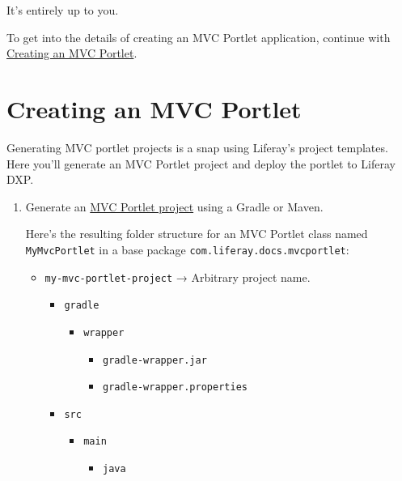 It's entirely up to you.

To get into the details of creating an MVC Portlet application, continue
with
\href{/docs/7-2/appdev/-/knowledge_base/a/creating-an-mvc-portlet}{Creating
an MVC Portlet}.

\chapter{Creating an MVC Portlet}\label{creating-an-mvc-portlet}

Generating MVC portlet projects is a snap using Liferay's project
templates. Here you'll generate an MVC Portlet project and deploy the
portlet to Liferay DXP.

\begin{enumerate}
\def\labelenumi{\arabic{enumi}.}
\item
  Generate an
  \href{/docs/7-2/reference/-/knowledge_base/r/using-the-mvc-portlet-template}{MVC
  Portlet project} using a Gradle or Maven.

  Here's the resulting folder structure for an MVC Portlet class named
  \texttt{MyMvcPortlet} in a base package
  \texttt{com.liferay.docs.mvcportlet}:

  \begin{itemize}
  \tightlist
  \item
    \texttt{my-mvc-portlet-project} → Arbitrary project name.

    \begin{itemize}
    \tightlist
    \item
      \texttt{gradle}

      \begin{itemize}
      \tightlist
      \item
        \texttt{wrapper}

        \begin{itemize}
        \tightlist
        \item
          \texttt{gradle-wrapper.jar}
        \item
          \texttt{gradle-wrapper.properties}
        \end{itemize}
      \end{itemize}
    \item
      \texttt{src}

      \begin{itemize}
      \tightlist
      \item
        \texttt{main}

        \begin{itemize}
        \tightlist
        \item
          \texttt{java}


\end{itemize}
\end{itemize}
\end{itemize}
\end{itemize}
\end{enumerate}
